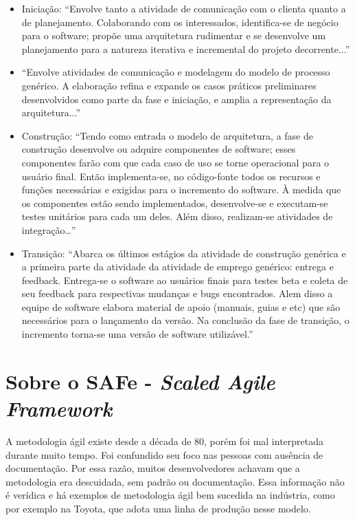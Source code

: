\begin{itemize}
\item Iniciação: “Envolve tanto a atividade de comunicação com o clienta quanto a de planejamento. Colaborando com os interessados, identifica-se de negócio para o software; propõe uma arquitetura rudimentar e se desenvolve um planejamento para a natureza iterativa e incremental do projeto decorrente...”
\item “Envolve atividades de comunicação e modelagem do modelo de processo genérico. A elaboração refina e expande os casos práticos preliminares desenvolvidos como parte da fase e iniciação, e amplia a representação da arquitetura...”
\item Construção: “Tendo como entrada o modelo de arquitetura, a fase de construção desenvolve ou adquire componentes de software; esses componentes farão com que cada caso de uso se torne operacional para o usuário final. Então implementa-se, no código-fonte todos os recursos e funções necessárias  e exigidas para o incremento do software. À medida que os componentes estão sendo implementados, desenvolve-se e executam-se testes unitários para cada um deles. Além disso, realizam-se atividades de integração…”
\item Transição: “Abarca os últimos estágios da atividade de construção genérica e a primeira parte da atividade da atividade de emprego genérico: entrega e feedback. Entrega-se o software ao usuários finais para testes beta e coleta de seu feedback para respectivas mudanças e bugs encontrados. Alem disso a equipe de software elabora material de apoio (manuais, guias e etc) que são necessários para o lançamento da versão. Na conclusão da fase de transição, o incremento torna-se uma versão de software utilizável.”
\end{itemize}

\section{Sobre o SAFe - \textit{Scaled Agile Framework}}

A metodologia ágil existe desde a década de 80, porém foi mal interpretada durante muito tempo. Foi confundido seu foco nas pessoas com ausência de documentação. Por essa razão, muitos desenvolvedores achavam que a metodologia era descuidada, sem padrão ou documentação. Essa informação não é verídica e há exemplos de metodologia ágil bem sucedida na indústria, como por exemplo na Toyota, que adota uma linha de produção nesse modelo. 

